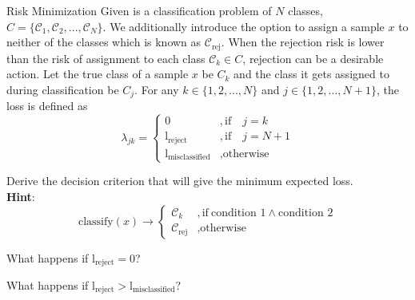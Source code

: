 \documentclass[
	ngerman,
	points=true,%
    solution=true,
    accentcolor=9c,
    colorbacktitle
	]{tudaexercise}
\begin{document}
\begin{task}{Risk Minimization}
Given is a classification problem of $N$ classes, $C=\{\mathcal{C}_1, \mathcal{C}_2, ..., \mathcal{C}_N\}$. We additionally introduce the option to assign a sample $x$ to neither of the classes which is known as $\mathcal{C}_{\text{rej}}$. When the rejection risk is lower than the risk of assignment to each class $\mathcal{C}_k\in C$, rejection can be a desirable action. Let the true class of a sample $x$ be $C_{k}$ and the class it gets assigned to during classification be $C_j$. For any $k\in\{1, 2, ..., N\}$ and $j\in\{1, 2, ..., N+1\}$, the loss is defined as 
\[
\lambda_{jk}=\begin{cases}
0  & ,\text{if} \quad j=k \\
\text{l}_{\text{reject}} & ,\text{if} \quad j=N+1 \\
\text{l}_{\text{misclassified}} & ,\text{otherwise} 
\end{cases}
\]
\begin{subtask}
Derive the decision criterion that will give the minimum expected loss. \\
\textbf{Hint}:
\[
    \text{classify}(x)\rightarrow 
    \begin{cases}
        \mathcal{C}_k  &, \text{if} \ \text{condition 1} \land \text{condition 2}\\
        \mathcal{C}_{\text{rej}} &, \text{otherwise}       
    \end{cases}
\]
\end{subtask}
\begin{solution}
    
\end{solution}

\begin{subtask}
What happens if $\text{l}_{\text{reject}}=0$?
\end{subtask}
\begin{solution}
    
\end{solution}

\begin{subtask}
What happens if $\text{l}_{\text{reject}} > \text{l}_{\text{misclassified}}$?
\end{subtask}
\begin{solution}
    
\end{solution}
\end{task}
\end{document}
